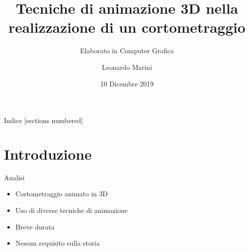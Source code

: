 \documentclass[10pt]{beamer}
\title{Tecniche di animazione 3D nella realizzazione di un cortometraggio}
\subtitle{Elaborato in Computer Grafica}						%
\date{10 Dicembre 2019}
\author{Leonardo Marini}
\institute{ALMA MATER STUDIORUM - UNIVERSITÀ DI BOLOGNA}
\begin{document}
\maketitle

\begin{frame}{Indice}																		%
  [sections numbered] %
  \tableofcontents%
\end{frame}

\section[Intro]{Introduzione}

\begin{frame}{Analisi} 
      \begin{itemize}[<+- | alert@+>]								%
        \item Cortometraggio animato in 3D 					%
        \item Uso di diverse tecniche di animazione %
        \item Breve durata 													%
				\item Nessun requisito sulla storia 				%
      \end{itemize}
\end{frame}

%
%
\end{document}
